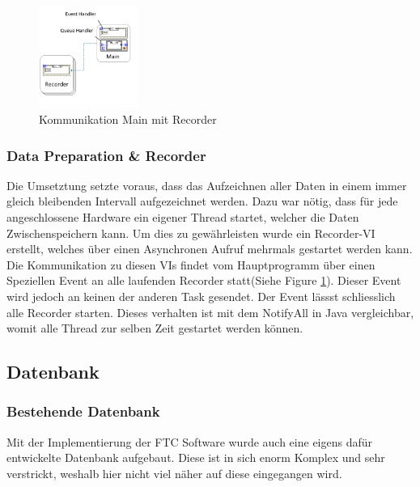 \documentclass[10pt]{scrartcl}
\begin{document}
\begin{figure}
	\begin{center}
		\includegraphics[width=0.29\textwidth]{LauftzeitansichtRecorderNah}
		\caption{Kommunikation Main mit Recorder}
		\label{fig:LauftzeitansichtRecorder}
	\end{center}
\end{figure}
\subsubsection{Data Preparation \& Recorder}
Die Umsetztung setzte voraus, dass das Aufzeichnen aller Daten in einem immer gleich bleibenden Intervall aufgezeichnet werden. Dazu war nötig, dass für jede angeschlossene Hardware ein eigener Thread startet, welcher die Daten Zwischenspeichern kann. Um dies zu gewährleisten wurde ein Recorder-\gls{VI} erstellt, welches über einen Asynchronen Aufruf mehrmals gestartet werden kann. Die Kommunikation zu diesen \gls{VI}s findet vom Hauptprogramm über einen Speziellen Event an alle laufenden Recorder statt(Siehe Figure \ref{fig:LauftzeitansichtRecorder}). Dieser Event wird jedoch an keinen der anderen Task gesendet. Der Event lässst schliesslich alle Recorder starten. Dieses verhalten ist mit dem NotifyAll in Java vergleichbar, womit alle Thread zur selben Zeit gestartet werden können. 

\subsection{Datenbank}
\subsubsection{Bestehende Datenbank}
Mit der Implementierung der FTC Software wurde auch eine eigens dafür entwickelte Datenbank aufgebaut. Diese ist in sich enorm Komplex und sehr verstrickt, weshalb hier nicht viel näher auf diese eingegangen wird.
\end{document}
